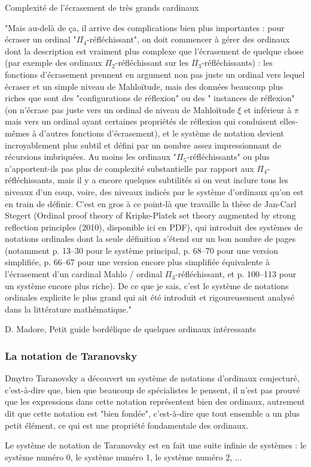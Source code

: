 \documentclass[12pt]{beamer}
\begin{document}
\begin{frame}
Complexité de l'écrasement de très grands cardinaux

\medskip

\scriptsize

"Mais au-delà de ça, il arrive des complications bien plus importantes : pour écraser un ordinal "$\Pi_4$-réfléchissant", on doit commencer à gérer des ordinaux dont la description est vraiment plus complexe que l'écrasement de quelque chose (par exemple des ordinaux $\Pi_2$-réfléchissant sur les $\Pi_3$-réfléchissants) : les fonctions d'écrasement prennent en argument non pas juste un ordinal vers lequel écraser et un simple niveau de Mahloïtude, mais des données beaucoup plus riches que sont des "configurations de réflexion" ou des " instances de réflexion" (on n'écrase pas juste vers un ordinal de niveau de Mahloïtude $\xi$ et inférieur à $\pi$ mais vers un ordinal ayant certaines propriétés de réflexion qui conduisent elles-mêmes à d'autres fonctions d'écrasement), et le système de notation devient incroyablement plus subtil et défini par un nombre assez impressionnant de récursions imbriquées. Au moins les ordinaux "$\Pi_5$-réfléchissants" ou plus n'apportent-ils pas plus de complexité substantielle par rapport aux $\Pi_4$-réfléchissants, mais il y a encore quelques subtilités si on veut inclure tous les niveaux d'un coup, voire, des niveaux indicés par le système d'ordinaux qu'on est en train de définir. C'est en gros à ce point-là que travaille la thèse de Jan-Carl Stegert (Ordinal proof theory of Kripke-Platek set theory augmented by strong reflection principles (2010), disponible ici en PDF), qui introduit des systèmes de notations ordinales dont la seule définition s'étend sur un bon nombre de pages (notamment p. 13–30 pour le système principal, p. 68–70 pour une version simplifiée, p. 66–67 pour une version encore plus simplifiée équivalente à l'écrasement d'un cardinal Mahlo / ordinal $\Pi_3$-réfléchissant, et p. 100–113 pour un système encore plus riche). De ce que je sais, c'est le système de notations ordinales explicite le plus grand qui ait été introduit et rigoureusement analysé dans la littérature mathématique."

\medskip

\footnotesize

D. Madore, Petit guide bordélique de quelques ordinaux intéressants

\end{frame}
\begin{frame}
\frametitle{La notation de Taranovsky}

\small

Dmytro Taranovsky a découvert un système de notations d'ordinaux conjecturé, c'est-à-dire que, bien que beaucoup de spécialistes le pensent, il n'est pas prouvé que les expressions dans cette notation représentent bien des ordinaux, autrement dit que cette notation est "bien fondée", c'est-à-dire que tout ensemble a un plus petit élément, ce qui est une propriété fondamentale des ordinaux.

Le système de notation de Taranovsky est en fait une suite infinie de systèmes : le système numéro 0, le système numéro 1, le système numéro 2, ...

\end{frame}
\end{document}
